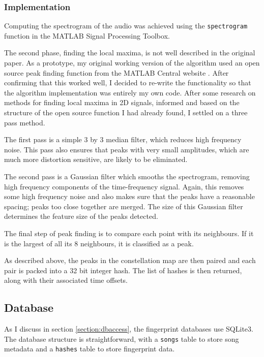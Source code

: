 \documentclass[12pt,a4paper,twoside,openright]{report}
\begin{document}
\subsubsection{Implementation}

Computing the spectrogram of the audio was achieved using the \lstinline{spectrogram} function in the MATLAB Signal Processing Toolbox.

The second phase, finding the local maxima, is not well described in the original paper. As a prototype, my original working version of the algorithm used an open source peak finding function from the MATLAB Central website \cite{PeakFinder}. After confirming that this worked well, I decided to re-write the functionality so that the algorithm implementation was entirely my own code. After some research on methods for finding local maxima in 2D signals, informed and based on the structure of the open source function I had already found, I settled on a three pass method. 

The first pass is a simple 3 by 3 median filter, which reduces high frequency noise. This pass also ensures that peaks with very small amplitudes, which are much more distortion sensitive, are likely to be eliminated.

The second pass is a Gaussian filter which smooths the spectrogram, removing high frequency components of the time-frequency signal. Again, this removes some high frequency noise and also makes sure that the peaks have a reasonable spacing; peaks too close together are merged. The size of this Gaussian filter determines the feature size of the peaks detected. 

The final step of peak finding is to compare each point with its neighbours. If it is the largest of all its 8 neighbours, it is classified as a peak.

As described above, the peaks in the constellation map are then paired and each pair is packed into a 32 bit integer hash. The list of hashes is then returned, along with their associated time offsets.


\subsection{Database}
\label{shazam:db}

As I discuss in section \ref{section:dbaccess}, the fingerprint databases use SQLite3. The database structure is straightforward, with a \lstinline{songs} table to store song metadata and a \lstinline{hashes} table to store fingerprint data.
\end{document}
